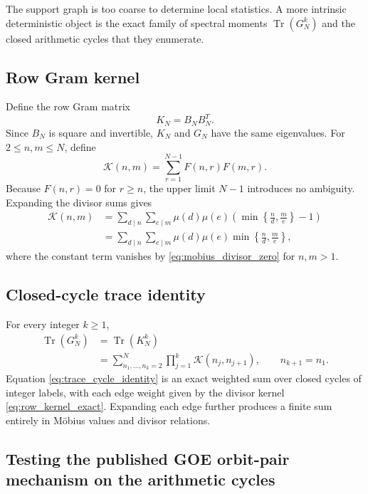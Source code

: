 \documentclass[11pt]{amsart}
\numberwithin{equation}{section}
\theoremstyle{plain}
\theoremstyle{definition}
\theoremstyle{remark}
\newcommand{\mob}{\mu}
\newcommand{\Tr}{\operatorname{Tr}}
\begin{document}
The support graph is too coarse to determine local statistics.  A more intrinsic deterministic object is the exact family of spectral moments $\Tr(G_N^k)$ and the closed arithmetic cycles that they enumerate.

\subsection{Row Gram kernel}
\label{subsec:row_gram_kernel}

Define the row Gram matrix
\begin{equation}
K_N=B_NB_N^T.
\label{eq:row_gram}
\end{equation}
Since $B_N$ is square and invertible, $K_N$ and $G_N$ have the same eigenvalues.  For $2\le n,m\le N$, define
\begin{equation}
\mathcal K(n,m)=\sum_{r=1}^{N-1}F(n,r)F(m,r).
\label{eq:row_kernel_definition}
\end{equation}
Because $F(n,r)=0$ for $r\ge n$, the upper limit $N-1$ introduces no ambiguity.  Expanding the divisor sums gives
\begin{align}
\mathcal K(n,m)
&=
\sum_{d\mid n}\sum_{e\mid m}
\mob(d)\mob(e)
\left(\min\left\{\frac nd,\frac me\right\}-1\right)
\label{eq:row_kernel_with_constant}\\
&=
\sum_{d\mid n}\sum_{e\mid m}
\mob(d)\mob(e)
\min\left\{\frac nd,\frac me\right\},
\label{eq:row_kernel_exact}
\end{align}
where the constant term vanishes by \eqref{eq:mobius_divisor_zero} for $n,m>1$.

\subsection{Closed-cycle trace identity}
\label{subsec:closed_cycle_trace}

For every integer $k\ge1$,
\begin{align}
\Tr(G_N^k)
&=\Tr(K_N^k)
\label{eq:trace_gram_equality}\\
&=
\sum_{n_1,\ldots,n_k=2}^{N}
\prod_{j=1}^{k}
\mathcal K(n_j,n_{j+1}),
\qquad n_{k+1}=n_1.
\label{eq:trace_cycle_identity}
\end{align}
Equation \eqref{eq:trace_cycle_identity} is an exact weighted sum over closed cycles of integer labels, with each edge weight given by the divisor kernel \eqref{eq:row_kernel_exact}.  Expanding each edge further produces a finite sum entirely in M\"obius values and divisor relations.

\subsection{Testing the published GOE orbit-pair mechanism on the arithmetic cycles}
\label{subsec:test_goe_orbit_pair}
\end{document}
